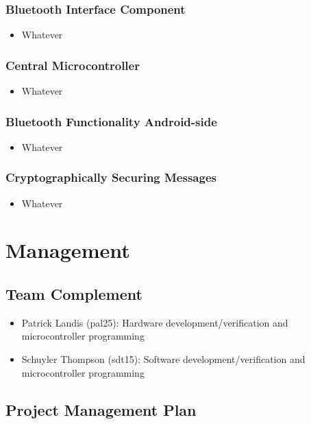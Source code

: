 \documentclass[12pt,letterpaper]{article}
\begin{document}
\subsubsection{Bluetooth Interface Component}
\begin{itemize}
\item Whatever
\end{itemize}

\subsubsection{Central Microcontroller}
\begin{itemize}
\item Whatever
\end{itemize}

\subsubsection{Bluetooth Functionality Android-side}
\begin{itemize}
\item Whatever
\end{itemize}

\subsubsection{Cryptographically Securing Messages}
\begin{itemize}
\item Whatever
\end{itemize}

\section{Management}
\subsection{Team Complement}
\begin{itemize}
	\item Patrick Landis (pal25): Hardware development/verification and microcontroller programming

	\item Schuyler Thompson (sdt15): Software development/verification and microcontroller programming
\end{itemize}

\subsection{Project Management Plan}
\end{document}
